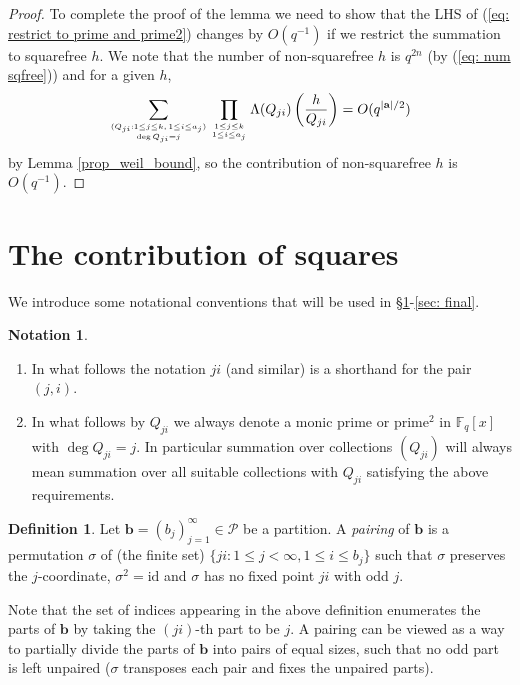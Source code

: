 \documentclass[alphabetic, 
        colorlinks,
        linkcolor=red,  citecolor=blue,
        backref
]{amsart}
\numberwithin{equation}{section}
\theoremstyle{definition}
\newtheorem{definition}[claim]{Definition}
\newtheorem{notation}[claim]{Notation}
\newcommand{\N}{{\mathbb N}}
\newcommand{\F}{\mathbb{F}}
\begin{document}
\begin{proof}
To complete the proof of the lemma we need to show that the LHS of (\ref{eq: restrict to prime and prime2}) changes by $O(q^{-1})$ if we restrict the summation to squarefree $h$. We note that the number of non-squarefree $h$ is $q^{2n}$ (by (\ref{eq: num sqfree})) and for a given $h$,    
    $$\sum_{(Q_{ji}:1\le j\le k,\,1\le i\le a_j)\atop{\deg Q_{ji}=j}}\prod_{1\le j\le k\atop{1\le i\le a_j}}\Lambda(Q_{ji})\left(\frac h{Q_{ji}}\right)=O(q^{|\mathbf a|/2})$$
by Lemma \ref{prop_weil_bound}, so the contribution of non-squarefree $h$ is $O(q^{-1})$.
\end{proof}


\section{The contribution of squares}
\label{sec: squares}

We introduce some notational conventions that will be used in \S\ref{sec: squares}-\ref{sec: final}.

\begin{notation}\label{not: ji}\begin{enumerate}\item[(i)] In what follows the notation $ji$ (and similar) is a shorthand for the pair $(j,i)$.
\item[(ii)] In what follows by $Q_{ji}$ we always denote a monic prime or prime$^2$ in $\F_q[x]$ with $\deg Q_{ji}=j$. In particular summation over collections $(Q_{ji})$ will always mean summation over all suitable collections with $Q_{ji}$ satisfying the above requirements.
\end{enumerate}\end{notation}

\begin{definition}\label{def: pairing}
Let $\mathbf b=(b_j)_{j=1}^\infty\in\mathcal P$ be a partition.
A  \emph{pairing} of $\mathbf b$ is a permutation $\sigma$ of (the finite set) $\{ji:1\le j< \infty,1\le i\le b_j\}$ such that $\sigma$ preserves the $j$-coordinate, $\sigma^2=\mathrm{id}$ and $\sigma$ has no fixed point $ji$ with odd $j$.

\end{definition}

Note that the set of indices appearing in the above definition enumerates the parts of $\mathbf b$ by taking the $(ji)$-th part to be $j$. A {pairing} can be viewed as a way to partially divide the parts of $\mathbf b$ into pairs of equal sizes, such that no odd part is left unpaired ($\sigma$ transposes each pair and fixes the unpaired parts).
\end{document}
